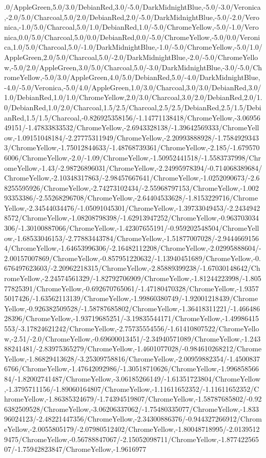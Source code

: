 {\begin{tikzternal}
.0/AppleGreen,5.0/3.0/DebianRed,3.0/-5.0/DarkMidnightBlue,-5.0/-3.0/Veronica,-2.0/5.0/Charcoal,5.0/2.0/DebianRed,2.0/-5.0/DarkMidnightBlue,-5.0/-2.0/Veronica,-1.0/5.0/Charcoal,5.0/1.0/DebianRed,1.0/-5.0/ChromeYellow,-5.0/-1.0/Veronica,0.0/5.0/Charcoal,5.0/0.0/DebianRed,0.0/-5.0/ChromeYellow,-5.0/0.0/Veronica,1.0/5.0/Charcoal,5.0/-1.0/DarkMidnightBlue,-1.0/-5.0/ChromeYellow,-5.0/1.0/AppleGreen,2.0/5.0/Charcoal,5.0/-2.0/DarkMidnightBlue,-2.0/-5.0/ChromeYellow,-5.0/2.0/AppleGreen,3.0/5.0/Charcoal,5.0/-3.0/DarkMidnightBlue,-3.0/-5.0/ChromeYellow,-5.0/3.0/AppleGreen,4.0/5.0/DebianRed,5.0/-4.0/DarkMidnightBlue,-4.0/-5.0/Veronica,-5.0/4.0/AppleGreen,1.0/3.0/Charcoal,3.0/3.0/DebianRed,3.0/1.0/DebianRed,1.0/1.0/ChromeYellow,2.0/3.0/Charcoal,3.0/2.0/DebianRed,2.0/1.0/DebianRed,1.0/2.0/Charcoal,1.5/2.5/Charcoal,2.5/2.5/DebianRed,2.5/1.5/DebianRed,1.5/1.5/Charcoal,-0.826925358156/-1.14771138418/ChromeYellow,-3.0695649151/-1.47833833532/ChromeYellow,-2.6943328138/-1.39642569333/ChromeYellow,-1.09151048184/-2.27775311949/ChromeYellow,-2.20993888928/-1.75849293433/ChromeYellow,-1.75012844633/-1.48768739361/ChromeYellow,-2.185/-1.6795706006/ChromeYellow,-2.0/-1.09/ChromeYellow,-1.50952441518/-1.5583737998/ChromeYellow,-1.43/-2.98726896031/ChromeYellow,-2.24995978394/-0.714068389684/ChromeYellow,-2.10348317863/-2.98457667641/ChromeYellow,-1.0252090673/-2.68255595926/ChromeYellow,-2.74273102434/-2.55968797153/ChromeYellow,-1.00293353386/-2.55268296708/ChromeYellow,-2.64404533628/-1.8153229716/ChromeYellow,-2.34544034476/-1.05091045301/ChromeYellow,-1.39733049453/-2.24349428572/ChromeYellow,-1.08208798398/-1.62913947252/ChromeYellow,-0.963703034306/-1.30100887066/ChromeYellow,-1.42307655191/-0.959202548504/ChromeYellow,-1.68533046153/-2.77883443784/ChromeYellow,-1.51877007028/-2.94446691564/ChromeYellow,-1.64653996306/-2.16482112208/ChromeYellow,-2.02995888604/-2.00157007869/ChromeYellow,-0.857951220632/-1.13940451689/ChromeYellow,-0.676497623603/-2.20962218315/ChromeYellow,-2.85889399238/-1.67030148642/ChromeYellow,-2.24574561329/-1.82792706909/ChromeYellow,-1.81244223998/-1.80577825391/ChromeYellow,-0.692670765061/-1.47180470328/ChromeYellow,-1.93575017426/-1.63562113139/ChromeYellow,-1.99860380749/-1.92001218439/ChromeYellow,-0.926382509528/-1.58787685802/ChromeYellow,-1.36418311221/-1.46648628396/ChromeYellow,-1.93719685251/-3.19835544171/ChromeYellow,-1.49986415553/-3.17824621242/ChromeYellow,-2.75735554556/-1.61410807522/ChromeYellow,-2.51/-2.0/ChromeYellow,-0.69600013451/-2.34940571089/ChromeYellow,-1.24388241481/-2.83975365279/ChromeYellow,-1.4601077028/-0.984610268212/ChromeYellow,-1.86829413628/-3.25309758816/ChromeYellow,-2.00959882354/-1.45008376766/ChromeYellow,-1.47642092986/-1.30518710626/ChromeYellow,-1.99685856684/-1.82002741487/ChromeYellow,-3.06185266149/-1.61351723804/ChromeYellow,-1.3795711156/-1.89060164807/ChromeYellow,-1.11611652352/-1.11611652352/ChromeYellow,-1.86385324679/-1.74394519807/ChromeYellow,-1.58787685802/-0.926382509528/ChromeYellow,-3.06206337062/-1.75480335077/ChromeYellow,-1.83396024123/-2.48221447356/ChromeYellow,-2.34300886376/-0.944327266912/ChromeYellow,-2.0055805179/-2.07980512402/ChromeYellow,-1.80048718995/-2.01395129475/ChromeYellow,-0.56788847067/-2.15052098711/ChromeYellow,-1.87742256507/-1.75942823847/ChromeYellow,-1.9616977
\end{tikzternal}}
